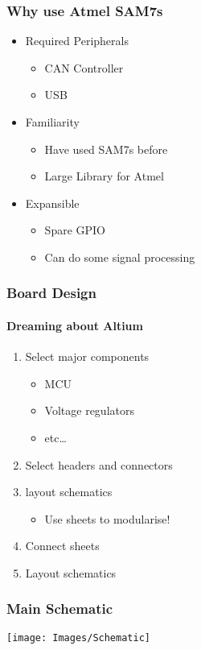 \documentclass{beamer}
\begin{document}
\begin{frame}
\frametitle{Why use Atmel SAM7s}
\begin{itemize}
\item Required Peripherals 
  \begin{itemize}
  \item CAN Controller
  \item USB
  \end{itemize}
\item Familiarity
  \begin{itemize}
  \item Have used SAM7s before
  \item Large Library for Atmel
  \end{itemize}
\item Expansible
  \begin{itemize}
  \item Spare GPIO
  \item Can do some signal processing
  \end{itemize}
\end{itemize}
\end{frame}

\begin{frame}
\frametitle{Board Design}
\framesubtitle{Dreaming about Altium}
\begin{enumerate}
\item Select major components
  \begin{itemize}
  \item MCU
  \item Voltage regulators
  \item etc\ldots
  \end{itemize}
\item Select headers and connectors
\item layout schematics
  \begin{itemize}
  \item Use sheets to modularise!
  \end{itemize}
\item Connect sheets
\item Layout schematics
\end{enumerate}
\end{frame}

\begin{frame}
\frametitle{Main Schematic}
    \begin{center}
      \texttt{[image: Images/Schematic]}
    \end{center}
\end{frame}
\end{document}
